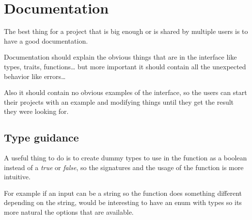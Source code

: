 \section{Documentation}

The best thing for a project that is big enough or is shared by multiple users is to have a good documentation.

Documentation should explain the obvious things that are in the interface like types, traits, functions…
but more important it should contain all the unexpected behavior like errors…

Also it should contain no obvious examples of the interface,
so the users can start their projects with an example and modifying things until they get the result they were looking for.

\subsection{Type guidance}

A useful thing to do is to create dummy types to use in the function as a boolean instead of a \textit{true} or \textit{false},
so the signatures and the usage of the function is more intuitive.

For example if an input can be a string so the function does something different depending on the string,
would be interesting to have an enum with types so its more natural the options that are available.
